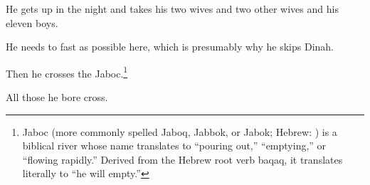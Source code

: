 {
}
{
}
{
	He gets up in the night and takes his two wives and two other wives
	and his eleven boys.
	
	
	He needs to fast as possible here,
	which is presumably why he skips Dinah.


	Then he crosses the Jaboc.\footnote{
		Jaboc (more commonly spelled Jaboq, Jabbok, or Jabok; Hebrew: )
		is a biblical river whose name translates to ``pouring out,''
		``emptying,'' or ``flowing rapidly.'' Derived from the Hebrew
		root verb baqaq, it translates literally to ``he will empty.''
	}


}


{
}
{
}
{
	All those he bore cross.
}


